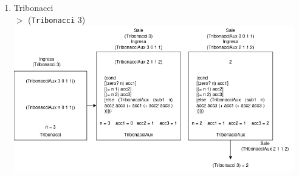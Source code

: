\documentclass[11pt]{article}
\begin{document}
\begin{enumerate}[leftmargin=0.8cm]
\begin{enumerate}
        \item Tribonacci\\
        $>$ (\texttt{Tribonacci} 3)\\
        \includegraphics[height = 2.5in]{Tribonacci_cola.png} 
    \end{enumerate}
\end{enumerate}
\end{document}
